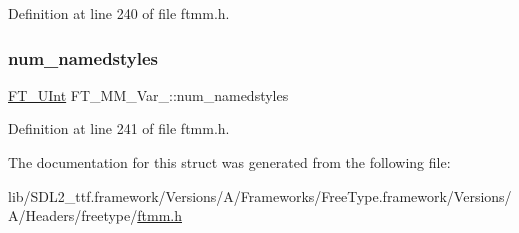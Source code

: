 Definition at line 240 of file ftmm.\+h.

\mbox{\label{struct_f_t___m_m___var___ac54bdd53447f4967b5d3b1a341a4bdff}} 
\subsubsection{\texorpdfstring{num\_namedstyles}{num\_namedstyles}}
{\footnotesize\ttfamily \mbox{\hyperlink{fttypes_8h_abcb8db4dbf35d2b55a9e8c7b0926dc52}{F\+T\+\_\+\+U\+Int}} F\+T\+\_\+\+M\+M\+\_\+\+Var\+\_\+\+::num\+\_\+namedstyles}



Definition at line 241 of file ftmm.\+h.



The documentation for this struct was generated from the following file\+:\begin{DoxyCompactItemize}
\item 
lib/\+S\+D\+L2\+\_\+ttf.\+framework/\+Versions/\+A/\+Frameworks/\+Free\+Type.\+framework/\+Versions/\+A/\+Headers/freetype/\mbox{\hyperlink{ftmm_8h}{ftmm.\+h}}\end{DoxyCompactItemize}
